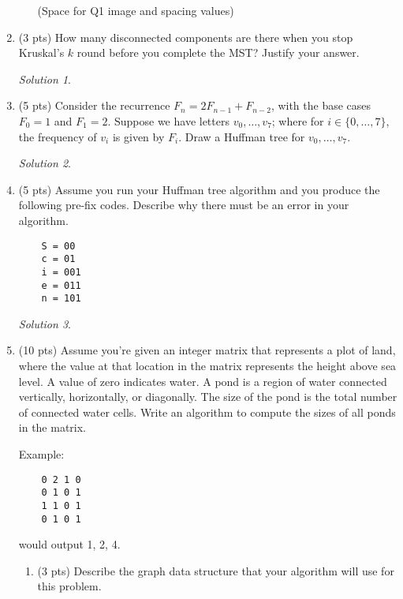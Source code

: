 \documentclass[12pt]{article}
\theoremstyle{remark}
\newtheorem*{solution}{Solution}
\begin{document}
\begin{enumerate}
\begin{enumerate}[label=(\alph*)]
(Space for Q1 image and spacing values)
\pagebreak


\end{enumerate}

\item (3 pts) How many disconnected components are there when you stop Kruskal's $k$ round before you complete the MST? Justify your answer. 
\begin{solution}

\end{solution}


\item (5 pts) Consider the recurrence $F_{n} = 2F_{n-1} + F_{n-2}$, with the base cases $F_{0} = 1$ and $F_{1} = 2$. Suppose we have letters $v_{0}, \ldots, v_{7}$; where for $i \in \{0, \ldots, 7\}$, the frequency of $v_{i}$ is given by $F_{i}$. Draw a Huffman tree for $v_{0}, \ldots, v_{7}$. 

\begin{solution}

\end{solution}
\pagebreak


\item (5 pts) Assume you run your Huffman tree algorithm and you produce the following pre-fix codes. Describe why there must be an error in your algorithm.
\begin{verbatim}
    S = 00
    c = 01
    i = 001
    e = 011
    n = 101
\end{verbatim}
\begin{solution}

\end{solution}
\pagebreak

\item (10 pts) Assume you're given an integer matrix that represents a plot of land, where the value at that location in the matrix represents the height above sea level. A value of zero indicates water. A pond is a region of water connected vertically, horizontally, or diagonally. The size of the pond is the total number of connected water cells. Write an algorithm to compute the sizes of all ponds in the matrix.

Example:
\begin{verbatim}
    0 2 1 0
    0 1 0 1
    1 1 0 1
    0 1 0 1
\end{verbatim}

would output 1, 2, 4.
\begin{enumerate}
    \item (3 pts) Describe the graph data structure that your algorithm will use for this problem.
    

\end{enumerate}
\end{enumerate}
\end{document}
